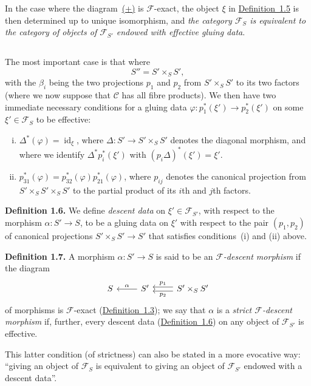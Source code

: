 \documentclass{article}
\newenvironment{rmenv}[1]
  {\phantomsection\par\medskip\noindent\textbf{#1.}\rmfamily}
  {\par\medskip}
\renewcommand{\cal}[1]{{\mathcal{#1}}}
\DeclareMathOperator{\id}{id}
\newcommand{\oldpage}[1]{\marginpar{\footnotesize$\Big\vert$ \textit{p.~#1}}}
\begin{document}
In the case where the diagram~\hyperref[equation-definition:A.1.3]{(+)} is $\cal{F}$-exact, the object $\xi$ in \hyperref[definition:A.1.5]{Definition~1.5} is then determined up to unique isomorphism, and \emph{the category $\cal{F}_S$ is equivalent to the category of objects of $\cal{F}_{S'}$ endowed with effective gluing data}.


\subsection{}
\label{A.1.c}
The most important case is that where
\[
  S'' = S' \times_S S',
\]
with the $\beta_i$ being the two projections $p_1$ and $p_2$ from $S'\times_S S'$ to its two factors (where we now suppose that $\cal{C}$ has all fibre products).
We then have two immediate necessary conditions for a gluing data $\varphi\colon p_1^*(\xi')\to p_2^*(\xi')$ on some $\xi'\in\cal{F}_S$ to be effective:
\begin{enumerate}[(i)]
  \item $\Delta^*(\varphi) = \id_\xi$, where $\Delta\colon S'\to S'\times_S S'$ denotes the diagonal morphism, and where we identify $\Delta^* p_i^*(\xi')$ with $(p_i\Delta)^*(\xi')=\xi'$.
  \item $p_{31}^*(\varphi) = p_{32}^*(\varphi)p_{21}^*(\varphi)$,
\oldpage{190-05}
  where $p_{ij}$ denotes the canonical projection from $S'\times_S S'\times_S S'$ to the partial product of its $i$th and $j$th factors.
\end{enumerate}

\begin{rmenv}{Definition 1.6}
\label{definition:A.1.6}
  We define \emph{descent data} on $\xi'\in\cal{F}_{S'}$, with respect to the morphism $\alpha\colon S'\to S$, to be a gluing data on $\xi'$ with respect to the pair $(p_1,p_2)$ of canonical projections $S'\times_S S'\to S'$ that satisfies conditions~(i) and (ii) above.
\end{rmenv}

\begin{rmenv}{Definition 1.7}
\label{definition:A.1.7}
  A morphism $\alpha\colon S'\to S$ is said to be an \emph{$\cal{F}$-descent morphism} if the diagram
  \[
    \begin{tikzcd}
      S
      & S' \lar[swap,"\alpha"]
      & S'\times_S S' \lar[shift left=1,"p_2"] \lar[shift right=1,swap,"p_1"]
    \end{tikzcd}
  \]
  of morphisms is $\cal{F}$-exact (\hyperref[definition:A.1.3]{Definition~1.3});
  we say that $\alpha$ is a \emph{strict $\cal{F}$-descent morphism} if, further, every descent data (\hyperref[definition:A.1.6]{Definition~1.6}) on any object of $\cal{F}_{S'}$ is effective.

  This latter condition (of strictness) can also be stated in a more evocative way:
  ``giving an object of $\cal{F}_S$ is equivalent to giving an object of $\cal{F}_{S'}$ endowed with a descent data''.
\end{rmenv}
\end{document}
